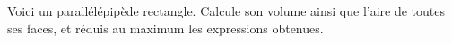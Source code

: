 %
%
Voici un parallélépipède rectangle. Calcule son volume ainsi que l'aire de toutes ses faces, et réduis au maximum les expressions obtenues.
